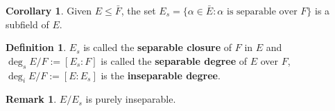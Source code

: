 \documentclass{article}
\theoremstyle{definition}
\newtheorem{dfn}{Definition}
\newtheorem{rem}{Remark}
\newtheorem{cor}{Corollary}
\begin{document}
\begin{cor}
	Given $E \leq \bar{F}$, the set $E_s = \{\alpha \in \bar{E}: \alpha \text{ is separable over }F\}$ is a subfield of $E$.
\end{cor}

\begin{dfn}
	$E_s$ is called the \textbf{separable closure} of $F$ in $E$ and $\deg_s E/F := [E_s:F]$ is called the \textbf{separable degree} of $E$ over $F$, $\deg_i E/F := [E:E_s]$ is the \textbf{inseparable degree}.
\end{dfn}

\begin{rem}
	$E/E_s$ is purely inseparable.
\end{rem}
\end{document}
